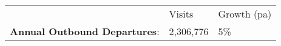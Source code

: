 \begin{tabular}[t]{p{4.8cm}>{\hfill}p{1.3cm}>{\hfill}p{1.4cm}}
   & Visits & Growth (pa) \\ 
 \textbf{Annual Outbound Departures}: & 2,306,776 & 5\% \\ 
  \end{tabular}
